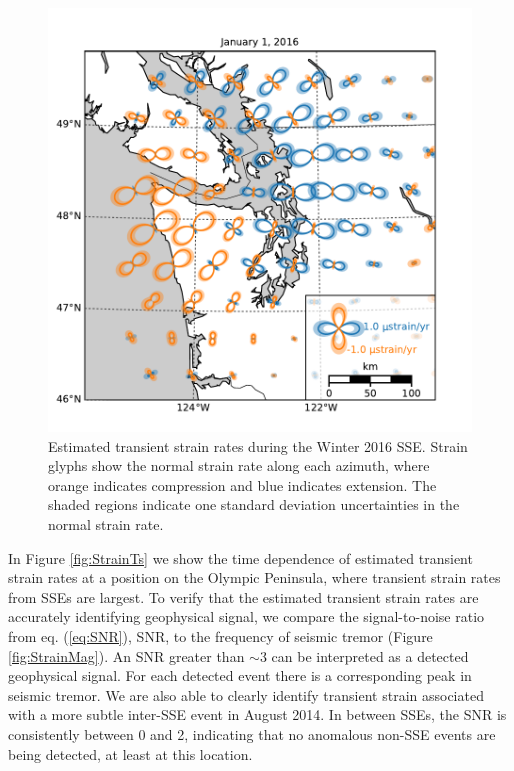 \documentclass[10pt,letter]{article}
\begin{document}
\begin{figure}
\includegraphics{figures/strain_map/strain-map.pdf}
\caption{Estimated transient strain rates during the Winter 2016 SSE. Strain glyphs show the normal strain rate along each azimuth, where orange indicates compression and blue indicates extension. The shaded regions indicate one standard deviation uncertainties in the normal strain rate.}   
\label{fig:StrainMap}
\end{figure}

In Figure \ref{fig:StrainTs} we show the time dependence of estimated transient strain rates at a position on the Olympic Peninsula, where transient strain rates from SSEs are largest. To verify that the estimated transient strain rates are accurately identifying geophysical signal, we compare the signal-to-noise ratio from eq. (\ref{eq:SNR}), SNR, to the frequency of seismic tremor (Figure \ref{fig:StrainMag}). An SNR greater than ${\sim}3$ can be interpreted as a detected geophysical signal. For each detected event there is a corresponding peak in seismic tremor. We are also able to clearly identify transient strain associated with a more subtle inter-SSE event in August 2014. In between SSEs, the SNR is consistently between 0 and 2, indicating that no anomalous non-SSE events are being detected, at least at this location. 
\end{document}
